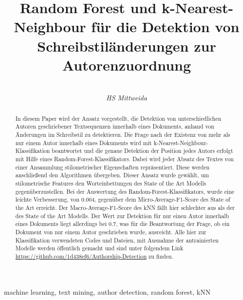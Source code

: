 \documentclass[conference]{IEEEtran}
\begin{document}
\title{Random Forest und k-Nearest-Neighbour für die Detektion von Schreibstiländerungen zur Autorenzuordnung}





\author{
 \\
\textit{HS Mittweida}
}
\maketitle

\begin{abstract}
In diesem Paper wird der Ansatz vorgestellt, die Detektion von unterschiedlichen Autoren geschriebener Textsequenzen innerhalb eines Dokuments, anhand von Änderungen im Schreibstil zu detektieren. Die Frage nach der Existenz von mehr als nur einem Autor innerhalb eines Dokuments wird mit k-Nearest-Neighbour-Klassifikation beantwortet und die genaue Detektion der Position jedes Autors erfolgt mit Hilfe eines Random-Forest-Klassifikators. Dabei wird jeder Absatz des Textes von einer Ansammlung stilometrischer Eigenschaften repräsentiert. Diese werden anschließend den Algorithmen übergeben. Dieser Ansatz wurde gewählt, um stilometrische Features den Worteinbettungen des State of the Art Modells gegenüberzustellen. Bei der Auswertung des Random-Forest-Klassifikators, wurde eine leichte Verbesserung, von 0.004, gegenüber dem Micro-Average-F1-Score des State of the Art erreicht. Der Macro-Average-F1-Score des kNN fällt hier schlechter aus als der des State of the Art Modells. Der Wert zur Detektion für nur einen Autor innerhalb eines Dokuments liegt allerdings bei 0.7, was für die Beantwortung der Frage, ob ein Dokument von nur einem Autor geschrieben wurde, ausreicht. Alle hier zur Klassifikation verwendeten Codes und Dateien, mit Ausnahme der antrainierten Modelle werden öffentlich gemacht und sind unter folgendem Link \url{https://github.com/1d438ef6/Authorship-Detection} zu finden.

\end{abstract}

\begin{IEEEkeywords}
	machine learning, text mining, author detection, random forest, kNN
\end{IEEEkeywords}
\end{document}
